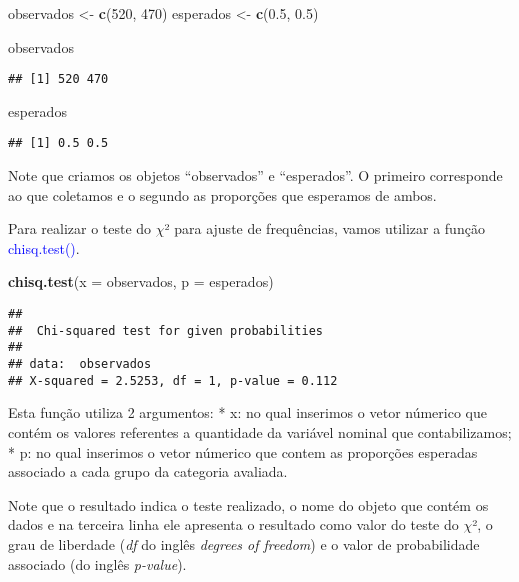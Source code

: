\documentclass[14pt,titlepage, oneside, openany, a4paper]{book}
\newenvironment{Shaded}{\begin{snugshade}}{\end{snugshade}}
\newcommand{\DataTypeTok}[1]{\textcolor[rgb]{0.13,0.29,0.53}{#1}}
\newcommand{\DecValTok}[1]{\textcolor[rgb]{0.00,0.00,0.81}{#1}}
\newcommand{\FloatTok}[1]{\textcolor[rgb]{0.00,0.00,0.81}{#1}}
\newcommand{\KeywordTok}[1]{\textcolor[rgb]{0.13,0.29,0.53}{\textbf{#1}}}
\newcommand{\NormalTok}[1]{#1}
\newcommand{\StringTok}[1]{\textcolor[rgb]{0.31,0.60,0.02}{#1}}
\begin{document}
\begin{Shaded}
\begin{Highlighting}[]
\NormalTok{observados <-}\StringTok{ }\KeywordTok{c}\NormalTok{(}\DecValTok{520}\NormalTok{, }\DecValTok{470}\NormalTok{)}
\NormalTok{esperados <-}\StringTok{ }\KeywordTok{c}\NormalTok{(}\FloatTok{0.5}\NormalTok{, }\FloatTok{0.5}\NormalTok{)}

\NormalTok{observados}
\end{Highlighting}
\end{Shaded}

\begin{verbatim}
## [1] 520 470
\end{verbatim}

\begin{Shaded}
\begin{Highlighting}[]
\NormalTok{esperados}
\end{Highlighting}
\end{Shaded}

\begin{verbatim}
## [1] 0.5 0.5
\end{verbatim}

Note que criamos os objetos ``observados'' e ``esperados''. O primeiro corresponde ao que coletamos e o segundo as proporções que esperamos de ambos.

Para realizar o teste do \(\chi\)² para ajuste de frequências, vamos utilizar a função \textcolor{blue}{chisq.test()}.

\begin{Shaded}
\begin{Highlighting}[]
\KeywordTok{chisq.test}\NormalTok{(}\DataTypeTok{x =}\NormalTok{ observados, }\DataTypeTok{p =}\NormalTok{ esperados)}
\end{Highlighting}
\end{Shaded}

\begin{verbatim}
## 
##  Chi-squared test for given probabilities
## 
## data:  observados
## X-squared = 2.5253, df = 1, p-value = 0.112
\end{verbatim}

Esta função utiliza 2 argumentos:
* x: no qual inserimos o vetor númerico que contém os valores referentes a quantidade da variável nominal que contabilizamos;
* p: no qual inserimos o vetor númerico que contem as proporções esperadas associado a cada grupo da categoria avaliada.

Note que o resultado indica o teste realizado, o nome do objeto que contém os dados e na terceira linha ele apresenta o resultado como valor do teste do \(\chi\)², o grau de liberdade (\emph{df} do inglês \emph{degrees of freedom}) e o valor de probabilidade associado (do inglês \emph{p-value}).
\end{document}
